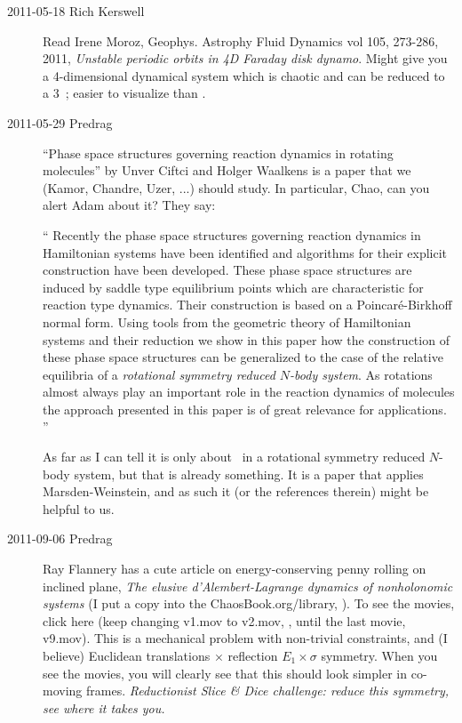 \begin{description}
\item[2011-05-18  Rich Kerswell] Read
Irene Moroz,
Geophys. Astrophy Fluid Dynamics vol 105, 273-286, 2011,
\emph{Unstable periodic orbits in 4D Faraday disk dynamo}.
Might give you a 4-dimensional dynamical system which is
chaotic and can be reduced to a 3\dmn\ \statesp; easier to
visualize than {\cLf}.

\item[2011-05-29 Predrag]
{``Phase space structures} governing reaction dynamics in rotating molecules''
by Unver Ciftci and Holger Waalkens is a paper that we (Kamor, Chandre,
Uzer, ...) should study. In particular, Chao, can you alert Adam about
it? They say:

``
Recently the phase space structures governing reaction dynamics in
Hamiltonian systems have been identified and algorithms for their
explicit construction have been developed. These phase space structures
are induced by saddle type equilibrium points which are characteristic
for reaction type dynamics. Their construction is based on a
Poincar{\'e}-Birkhoff normal form. Using tools from the geometric theory
of Hamiltonian systems and their reduction we show in this paper how the
construction of these phase space structures can be generalized to the
case of the relative equilibria of a \emph{rotational symmetry reduced
$N$-body system}. As rotations almost always play an important role in
the reaction dynamics of molecules the approach presented in this paper
is of great relevance for applications.
''

As far as I can tell it is only about \reqva\ in a rotational symmetry
reduced $N$-body system, but that is already something. It is a paper
that applies Marsden-Weinstein, and as such it (or the references
therein) might be helpful to us.

\item[2011-09-06 Predrag]
Ray Flannery
has a cute article on energy-\-conserving penny rolling on inclined
plane,
{\em The elusive {d'Alembert-Lagrange} dynamics of nonholonomic systems}
(I put a copy into the
ChaosBook.org/library,
).
To see the movies,
{click here}
(keep changing v1.mov to v2.mov, \etc, until the last movie,
{v9.mov}).
This is a mechanical problem with non-trivial constraints,
and (I believe) Euclidean translations $\times$ reflection
$E_1 \times \sigma$ symmetry. When you see the movies,
you will clearly see that this should look simpler in co-moving frames.
\emph{
Reductionist
Slice \& Dice challenge: reduce this symmetry, see where it takes you.
}


\end{description}
